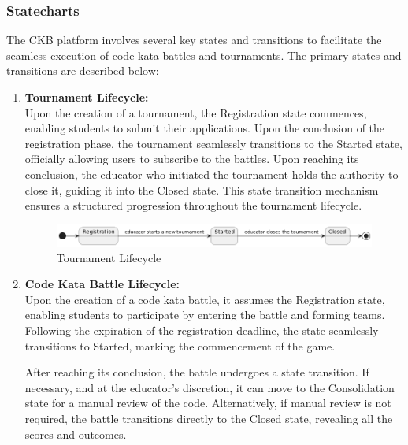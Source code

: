 \newpage

\subsubsection{Statecharts}


The CKB platform involves several key states and transitions to facilitate the seamless execution of code kata battles and tournaments. The primary states and transitions are described below:

\begin{enumerate}
    
    \item \textbf{Tournament Lifecycle:} \\
    Upon the creation of a tournament, the Registration state commences, enabling students to submit their applications. Upon the conclusion of the registration phase, the tournament seamlessly transitions to the Started state, officially allowing users to subscribe to the battles. Upon reaching its conclusion, the educator who initiated the tournament holds the authority to close it, guiding it into the Closed state. This state transition mechanism ensures a structured progression throughout the tournament lifecycle.
    
    \begin{figure}[H]
          \centering
          \includegraphics[width=1\textwidth]{Images/SC_TournamentLifecycle.png}
          \caption{Tournament Lifecycle}
          \label{fig:TournamentLifecycle}
    \end{figure}

    \item \textbf{Code Kata Battle Lifecycle:} \\
    Upon the creation of a code kata battle, it assumes the Registration state, enabling students to participate by entering the battle and forming teams. Following the expiration of the registration deadline, the state seamlessly transitions to Started, marking the commencement of the game.

    After reaching its conclusion, the battle undergoes a state transition. If necessary, and at the educator's discretion, it can move to the Consolidation state for a manual review of the code. Alternatively, if manual review is not required, the battle transitions directly to the Closed state, revealing all the scores and outcomes.


\end{enumerate}
